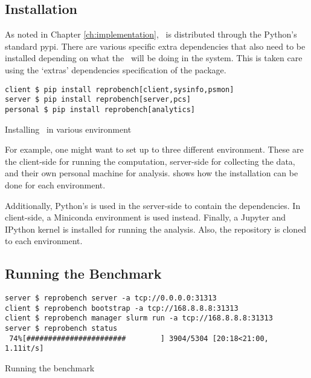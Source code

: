 \subsection{Installation}

As noted in Chapter \ref{ch:implementation}, \OurBenchmarkingTool~is distributed through the Python's standard pypi.
There are various specific extra dependencies that also need to be installed depending on what the \OurBenchmarkingTool~will be doing in the system.
This is taken care using the `extras' dependencies specification of the package.

\begin{listing}
	\begin{verbatim}
client $ pip install reprobench[client,sysinfo,psmon]
server $ pip install reprobench[server,pcs]
personal $ pip install reprobench[analytics]
    \end{verbatim}
	\caption{Installing \OurBenchmarkingTool~in various environment}
	\label{lst:eval.install}
\end{listing}

For example, one might want to set up to three different environment.
These are the client-side for running the computation, server-side for collecting the data, and their own personal machine for analysis.
 shows how the installation can be done for each environment.

Additionally, Python's  is used in the server-side to contain the dependencies.
In client-side, a Miniconda environment is used instead.
Finally, a Jupyter and IPython kernel is installed for running the analysis.
Also, the repository is cloned to each environment.

\subsection{Running the Benchmark}

\begin{listing}
	\begin{verbatim}
server $ reprobench server -a tcp://0.0.0.0:31313
client $ reprobench bootstrap -a tcp://168.8.8.8:31313
client $ reprobench manager slurm run -a tcp://168.8.8.8:31313
server $ reprobench status
 74%[#######################        ] 3904/5304 [20:18<21:00,  1.11it/s]
    \end{verbatim}
	\caption{Running the benchmark}
	\label{lst:eval.running}
\end{listing}


